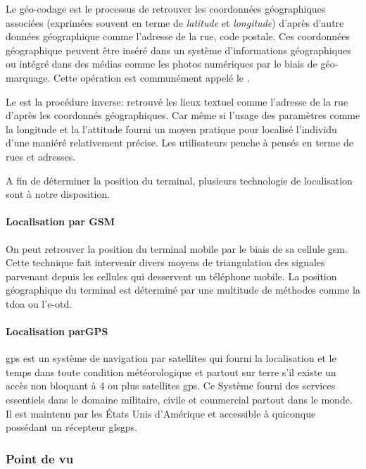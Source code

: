 Le géo-codage est le processus de retrouver les coordonnées
géographiques associées (exprimées souvent en terme de \textit{latitude}
et \textit{longitude}) d'après d'autre données géographique comme
l'adresse de la rue, code postale. Ces coordonnées géographique peuvent
être inséré dans un système d'informations géographiques ou intégré dans
des médias comme les photos numériques par le biais de géo-marquage.
Cette opération est communément appelé le .

Le  est la procédure inverse: retrouvé les lieux textuel comme l'adresse de la rue d'après les coordonnés géographiques. Car même si l'usage des paramètres comme la longitude et la l'attitude fourni un moyen pratique pour localisé l'individu d'une maniéré relativement précise. Les utilisateurs penche à pensés en terme de rues et adresses.

A fin de déterminer la position du terminal, plusieurs technologie de localisation sont à notre disposition.

\paragraph[Localisation par GSM]{Localisation par GSM}

On peut retrouver la position du terminal mobile par le biais de sa
cellule \gls{gsm}. Cette technique fait intervenir divers moyens de
triangulation des signales parvenant depuis les cellules qui desservent
un téléphone mobile. La position géographique du terminal est déterminé
par une multitude de méthodes comme la \gls{tdoa} ou l'\gls{e-otd}.

\paragraph[Localisation parGPS]{Localisation parGPS\cite{enig:gps}}

\gls{gps} est un système de navigation par satellites qui fourni la
localisation et le temps dans toute condition météorologique et partout
sur terre s'il existe un accès non bloquant à 4 ou plus satellites
\gls{gps}. Ce Système fourni des services essentiels dans le domaine
militaire, civile et commercial partout dans le monde. Il est maintenu
par les États Unis d'Amérique et accessible à quiconque possédant un
récepteur gls{gps}.

\subsubsection[Point de vu \android{}]{Point de vu \android{}\cite{pa4ad:chptr13}}

